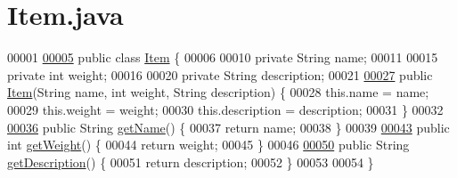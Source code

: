 \hypertarget{Item_8java_source}{\section{Item.\-java}
}

\begin{DoxyCode}
00001 
\hypertarget{Item_8java_source_l00005}{}\hyperlink{classItem}{00005} \textcolor{keyword}{public} \textcolor{keyword}{class }\hyperlink{classItem}{Item} \{
00006 
00010     \textcolor{keyword}{private} String name;
00011     
00015     \textcolor{keyword}{private} \textcolor{keywordtype}{int} weight;
00016 
00020     \textcolor{keyword}{private} String description;
00021 
\hypertarget{Item_8java_source_l00027}{}\hyperlink{classItem_acf7048ce82d4f6f047d926b1f6260f7c}{00027}     \textcolor{keyword}{public} \hyperlink{classItem_acf7048ce82d4f6f047d926b1f6260f7c}{Item}(String name, \textcolor{keywordtype}{int} weight, String description) \{
00028         this.name = name;
00029         this.weight = weight;
00030         this.description = description;
00031     \}
00032 
\hypertarget{Item_8java_source_l00036}{}\hyperlink{classItem_a78dd5a8370c5267c3f1f992167ab84ac}{00036}     \textcolor{keyword}{public} String \hyperlink{classItem_a78dd5a8370c5267c3f1f992167ab84ac}{getName}() \{
00037         \textcolor{keywordflow}{return} name;
00038     \}
00039 
\hypertarget{Item_8java_source_l00043}{}\hyperlink{classItem_a2ff9daec3cf9585fb5741062447a779d}{00043}     \textcolor{keyword}{public} \textcolor{keywordtype}{int} \hyperlink{classItem_a2ff9daec3cf9585fb5741062447a779d}{getWeight}() \{
00044         \textcolor{keywordflow}{return} weight;
00045     \}
00046 
\hypertarget{Item_8java_source_l00050}{}\hyperlink{classItem_abfe361bd046f5acdf4946bda076a8c8f}{00050}     \textcolor{keyword}{public} String \hyperlink{classItem_abfe361bd046f5acdf4946bda076a8c8f}{getDescription}() \{
00051         \textcolor{keywordflow}{return} description;
00052     \}
00053 
00054 \}
\end{DoxyCode}
